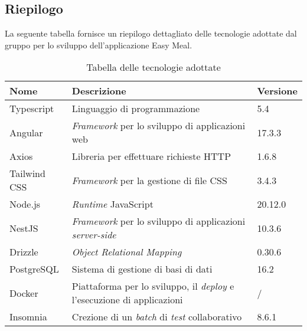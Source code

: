 \subsection{Riepilogo}
La seguente tabella fornisce un riepilogo dettagliato delle tecnologie adottate dal gruppo per lo sviluppo dell'applicazione Easy Meal.
\begin{table}[H]
	\centering
	\begin{tabularx}{\textwidth}{lXl}
		\hline
		\textbf{Nome} & \textbf{Descrizione}                                                           & \textbf{Versione} \\
		\hline
		Typescript    & Linguaggio di programmazione                                                   & 5.4               \\
		\hline
		Angular       & \textit{Framework} per lo sviluppo di applicazioni web                         & 17.3.3            \\
		\hline
		Axios         & Libreria per effettuare richieste HTTP                                         & 1.6.8             \\
		\hline
		Tailwind CSS  & \textit{Framework} per la gestione di file CSS                                 & 3.4.3             \\
		\hline
		Node.js       & \textit{Runtime} JavaScript                                                    & 20.12.0           \\
		\hline
		NestJS        & \textit{Framework} per lo sviluppo di applicazioni \textit{server-side}        & 10.3.6            \\
		\hline
		Drizzle       & \textit{Object Relational Mapping}                                             & 0.30.6            \\
		\hline
		PostgreSQL    & Sistema di gestione di basi di dati                                            & 16.2              \\
		\hline
		Docker        & Piattaforma per lo sviluppo, il \textit{deploy} e l'esecuzione di applicazioni & /                 \\
		\hline
		Insomnia      & Crezione di un \textit{batch} di \textit{test} collaborativo                   & 8.6.1             \\
		\hline
	\end{tabularx}
	\caption{Tabella delle tecnologie adottate}
\end{table}
